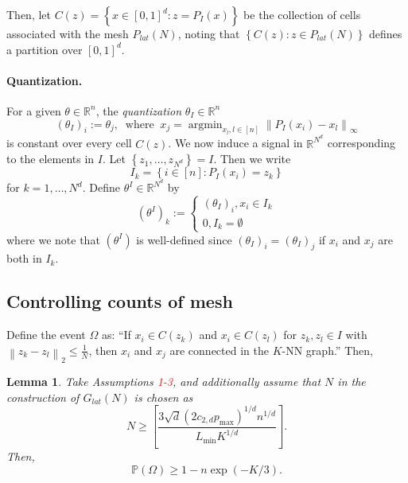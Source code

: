 \documentclass{article}
\newcommand{\Reals}{\mathbb{R}}
\newcommand{\norm}[1]{\left\lVert#1\right\rVert}
\newcommand{\set}[1]{\left\{#1\right\}}
\DeclareMathOperator*{\argmin}{argmin}
\newcommand{\Pbb}{\mathbb{P}}
\theoremstyle{alden}
\theoremstyle{aldenthm}
\newtheorem{lemma}{Lemma}
\theoremstyle{definition}
\theoremstyle{remark}
\begin{document}
Then, let $C(z) = \set{x \in [0,1]^d: z =  P_I(x)}$ be the collection of cells associated with the mesh $P_{lat}(N)$, noting that $\set{C(z): z \in P_{lat}(N)}$ defines a partition over $[0,1]^d$.

\paragraph{Quantization.}

For a given $\theta \in \Reals^n$, the \emph{quantization} $\theta_I \in \Reals^n$
\begin{equation*}
(\theta_{I})_i := \theta_j,~ \text{ where }~ x_j = \argmin_{x_l, l \in [n]} \norm{P_I(x_i) - x_l}_{\infty}
\end{equation*}
is constant over every cell $C(z)$. We now induce a signal in $\Reals^{N^d}$ corresponding to the elements in $I$. Let $\set{z_1, \ldots, z_{N^d}} = I$. Then
we write
\begin{equation*}
I_k = \set{i \in [n]: P_I(x_i) = z_k} 
\end{equation*}
for $k = 1,\ldots, N^d$. Define $\theta^{I} \in \Reals^{N^d}$ by
\begin{equation*}
(\theta^{I})_k := 
\begin{cases}
(\theta_I)_i, x_i \in I_k \\
0, I_k = \emptyset
\end{cases}
\end{equation*}
where we note that $(\theta^{I})$ is well-defined since $(\theta_I)_i = (\theta_I)_j$ if $x_i$ and $x_j$ are both in $I_k$.

\subsection{Controlling counts of mesh}

Define the event $\Omega$ as: ``If $x_i \in C(z_k)$ and $x_i \in C(z_l)$ for $z_k, z_l \in I$ with $\norm{z_k - z_l}_2 \leq \frac{1}{N}$, then $x_i$ and $x_j$ are connected in the $K$-NN graph.'' Then,
\begin{lemma}
	\label{lem: mesh_counts}
	Take Assumptions \textcolor{red}{1-3}, and additionally assume that $N$ in the construction of $G_{lat}(N)$ is chosen as
	\begin{equation}
	\label{eqn: N_lower_bound}
	N \geq \left[\frac{3\sqrt{d}(2 c_{2,d} p_{\max})^{1/d} n^{1/d}}{L_{\min} K^{1/d}}\right].
	\end{equation}
	Then,
	\begin{equation*}
	\Pbb(\Omega) \geq 1 - n \exp(-K / 3).
	\end{equation*}
\end{lemma}
\end{document}
